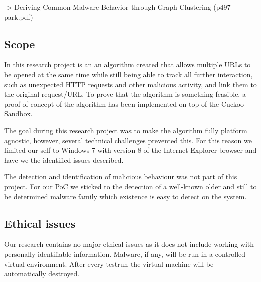 -> Deriving Common Malware Behavior through Graph Clustering (p497-park.pdf)

\subsection{Scope}


In this research project is an an algorithm created that allows multiple URLs to be opened at the same time while still being able to track all further interaction, such as unexpected HTTP requests and other malicious activity, and link them to the original request/URL. To prove that the algorithm is something feasible, a proof of concept of the algorithm has been implemented on top of the Cuckoo Sandbox.

The goal during this research project was to make the algorithm fully platform agnostic, however, several technical challenges prevented this. For this reason we limited our self to Windows 7 with version 8 of the Internet Explorer browser and have we the identified issues described.

The detection and identification of malicious behaviour was not part of this project. For our PoC we sticked to the detection of a well-known older and still to be determined malware family which existence is easy to detect on the system. 

\subsection{Ethical issues}

Our research contains no major ethical issues as it does not include working with personally identifiable information. Malware, if any, will be run in a controlled virtual environment. After every testrun the virtual machine will be automatically destroyed.

